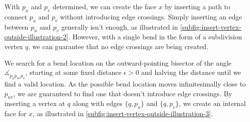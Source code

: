 
With $p_u$ and $p_v$ determined, we can create the face $x$ by inserting a path to connect $p_u$ and $p_v$ without introducing edge crossings. Simply inserting an edge between $p_u$ and $p_v$ generally isn't enough, as illustrated in \cref{subfig:insert-vertex-outside-illustration-2}. However, with a single bend in the form of a subdivision vertex $q$, we can guarantee that no edge crossings are being created.

We search for a bend location on the outward-pointing bisector of the angle $\measuredangle_{p_up_{uv}p_v}$, starting at some fixed distance $\epsilon > 0$ and halving the distance until we find a valid location. As the possible bend location moves infinitesimally close to $p_{uv}$, we are guaranteed to find one that doesn't introduce edge crossings. By inserting a vertex at $q$ along with edges $\{q,p_u\}$ and $\{q,p_v\}$, we create an internal face for $x$, as illustrated in \cref{subfig:insert-vertex-outside-illustration-3}.
